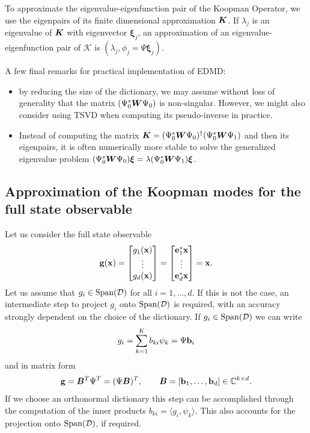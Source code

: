 To approximate the eigenvalue-eigenfunction pair of the Koopman Operator, we use the eigenpairs of its finite dimensional approximation $\vb*{K}$. If $\lambda_j$ is an eigenvalue of $\vb*{K}$ with eigenvector $\bm{\xi}_j$, an approximation of an eigenvalue-eigenfunction pair of $\mathcal{K}$ is $(\lambda_j, \phi_j = \Psi\bm{\xi}_j)$.

A few final remarks for practical implementation of EDMD:
\begin{itemize}
    \item by reducing the size of the dictionary, we may assume without loss of generality that the matrix $(\Psi_0^*\vb*{W}\Psi_0)$ is non-singular. However, we might also consider using TSVD when computing its pseudo-inverse in practice.  
    \item Instead of computing the matrix $\vb*{K} = (\Psi_0^*\vb*{W}\Psi_0)^{\dagger}(\Psi_0^*\vb*{W}\Psi_1)$ and then its eigenpairs, it is often numerically more stable to solve the generalized eigenvalue problem $(\Psi_0^*\vb*{W}\Psi_0)\bm{\xi} = \lambda(\Psi_0^*\vb*{W}\Psi_1)\bm{\xi}$.
\end{itemize}

\subsection{Approximation of the Koopman modes for the full state observable}
Let us consider the full state observable
\begin{equation}
    \label{full_state_def}
    \vb{g}(\vb{x}) = 
    \begin{bmatrix}
    g_1(\vb{x}) \\
    \vdots \\
    g_d(\vb{x})
    \end{bmatrix} = 
    \begin{bmatrix}
    \vb{e}_1^*\vb{x} \\
    \vdots \\
    \vb{e}_d^*\vb{x}
    \end{bmatrix} = \vb{x}.
\end{equation}
Let us assume that $g_i\in\mathrm{Span}(\mathcal{D})$ for all $i = 1,\dots,d$. If this is not the case, an intermediate step to project $g_i$ onto $\mathrm{Span}(\mathcal{D})$ is required, with an accuracy strongly dependent on the choice of the dictionary. If $g_i\in\mathrm{Span}(\mathcal{D})$ we can write
\begin{equation}
    g_i = \sum_{k=1}^K b_{ki}\psi_k = \Psi\vb{b}_i
\end{equation}
and in matrix form
\begin{equation*}
    \vb{g} = \vb*{B}^T\Psi^T = (\Psi\vb*{B})^T, \qquad \vb*{B} = \left[\vb{b}_1, \dots,\vb{b}_d\right]\in\mathbb{C}^{k\times d}.
\end{equation*}
If we choose an orthonormal dictionary this step can be accomplished through the computation of the inner products $b_{ki} = \langle g_i, \psi_k \rangle$. This also accounts for the projection onto $\mathrm{Span}(\mathcal{D})$, if required.

